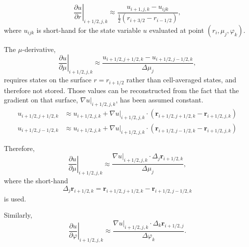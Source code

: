 \begin{equation}
    \left. \frac{\partial u}{\partial r} \right|_{i + 1/2, j, k} \approx \frac{u_{i+1,j,k} - u_{ijk}}{\frac{1}{2}(r_{i+3/2} - r_{i-1/2})},
\end{equation}
where $u_{ijk}$ is short-hand for the state variable $u$ evaluated at point $(r_i, \mu_j, \varphi_k)$.

The $\mu$-derivative,
\begin{equation}
    \left. \frac{\partial u}{\partial \mu} \right|_{i + 1/2, j, k} \approx \frac{u_{i+1/2,j+1/2,k} - u_{i+1/2,j-1/2,k}}{\Delta \mu_j},
\end{equation}
requires states on the surface $r=r_{i+1/2}$ rather than cell-averaged states, and therefore not stored. Those values can be reconstructed from the fact that the gradient
on that surface, $\left. \nabla u \right|_{i+1/2,j,k}$, has been assumed constant.
\begin{subequations}
    \begin{align}
        u_{i+1/2,j+1/2,k} &\approx u_{i+1/2,j,k} + \left. \nabla u \right|_{i+1/2,j,k} \cdot \left( \mathbf{r}_{i+1/2,j+1/2,k} - \mathbf{r}_{i+1/2,j,k} \right) \\
        u_{i+1/2,j-1/2,k} &\approx u_{i+1/2,j,k} + \left. \nabla u \right|_{i+1/2,j,k} \cdot \left( \mathbf{r}_{i+1/2,j-1/2,k} - \mathbf{r}_{i+1/2,j,k} \right)
    \end{align}
\end{subequations}

Therefore,
\begin{equation}
    \left. \frac{\partial u}{\partial \mu} \right|_{i+1/2, j, k} \approx \frac{ \left. \nabla u \right|_{i+1/2,j,k} \cdot \Delta_j \mathbf{r}_{i+1/2,k} }{\Delta \mu_j},
    \label{eqn:ellipsoidal_dudmu}
\end{equation}
where the short-hand
\begin{equation}
    \Delta_j \mathbf{r}_{i+1/2,k} = \mathbf{r}_{i+1/2,j+1/2,k} - \mathbf{r}_{i+1/2,j-1/2,k}
\end{equation}
is used.

Similarly,
\begin{equation}
    \left. \frac{\partial u}{\partial \varphi} \right|_{i+1/2, j, k} \approx \frac{ \left. \nabla u \right|_{i+1/2,j,k} \cdot \Delta_k \mathbf{r}_{i+1/2,j} }{\Delta \varphi_k}
    \label{eqn:ellipsoidal_dudpsi}.
\end{equation}

